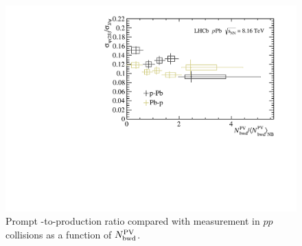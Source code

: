 \begin{figure}[H]
    \begin{center}
            \includegraphics[width=0.7\linewidth]{pdf/pPb/BWorkdir/Result/Norm.pdf}
    \end{center}
    \caption{Prompt \psitwos-to-\jpsi production ratio compared with measurement in $pp$ collisions as a function of $N^{\rm PV}_{\rm bwd}$.
      }
    \label{RBackpp}
\end{figure}

